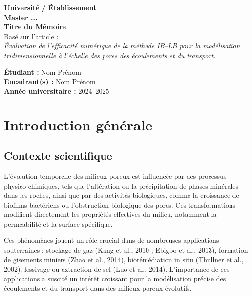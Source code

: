 \documentclass[12pt,a4paper]{report}
\begin{document}
\begin{titlepage}
    \centering
    {\Large \textbf{Université / Établissement}}\\[0.5cm]
    {\Large \textbf{Master ...}}\\[2cm]

    {\Huge \textbf{Titre du Mémoire}}\\[1cm]
    {\Large Basé sur l’article :}\\
    {\large \textit{Évaluation de l’efficacité numérique de la méthode IB–LB pour la modélisation tridimensionnelle à l’échelle des pores des écoulements et du transport.}}\\[2cm]

    \vfill

    \begin{flushleft}
    \textbf{Étudiant :} Nom Prénom \\
    \textbf{Encadrant(s) :} Nom Prénom \\
    \textbf{Année universitaire :} 2024–2025
    \end{flushleft}
\end{titlepage}


\tableofcontents
\newpage


\chapter{Introduction générale}
\section{Contexte scientifique}
L’évolution temporelle des milieux poreux est influencée par des processus physico-chimiques, tels que l’altération ou la précipitation de phases minérales dans les roches, ainsi que par des activités biologiques, comme la croissance de biofilms bactériens ou l’obstruction biologique des pores. Ces transformations modifient directement les propriétés effectives du milieu, notamment la perméabilité et la surface spécifique.

Ces phénomènes jouent un rôle crucial dans de nombreuses applications souterraines : stockage de gaz (Kang et al., 2010 ; Ebigbo et al., 2013), formation de gisements miniers (Zhao et al., 2014), biorémédiation in situ (Thullner et al., 2002), lessivage ou extraction de sel (Luo et al., 2014). L’importance de ces applications a suscité un intérêt croissant pour la modélisation précise des écoulements et du transport dans des milieux poreux évolutifs.
\end{document}
